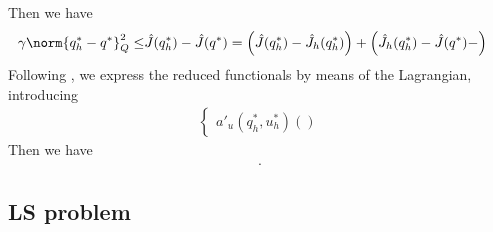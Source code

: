 Then we have
%
\begin{align*}
\gamma \norm{q^*_h-q^*}_Q^2 \le&  \hat J(q^*_h) - \hat J(q^*) = \left( \hat J(q^*_h)- \hat J_h(q^*_h)\right) + 
\left(  \hat J_h(q^*_h)- \hat J(q^*)-\right)
\end{align*}
%
Following \cite{Becker06}, we express the reduced functionals by means of the Lagrangian, introducing
%
\begin{align*}
%
\left\{
\begin{aligned}
a'_u(q^*_h,u^*_h)()
\end{aligned}
\right.
%
\end{align*}
%
Then we have
%
\begin{align*}
.
\end{align*}
%


 
%
\subsection{LS problem}\label{subsec:}
%
%

